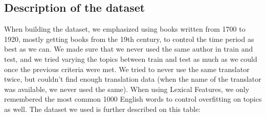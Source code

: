 \documentclass[10pt]{article}
\begin{document}
\subsection{Description of the dataset}
When building the dataset, we emphasized using books written from 1700 to 1920, mostly getting books from the 19th century, to control the time period as best as we can. We made sure that we never used the same author in train and test, and we tried varying the topics between train and test as much as we could once the previous criteria were met. We tried to never use the same translator twice, but couldn't find enough translation data (when the name of the translator was available, we never used the same). When using Lexical Features, we only remembered the most common 1000 English words to control overfitting on topics as well.
The dataset we used is further described on this table:
\end{document}
